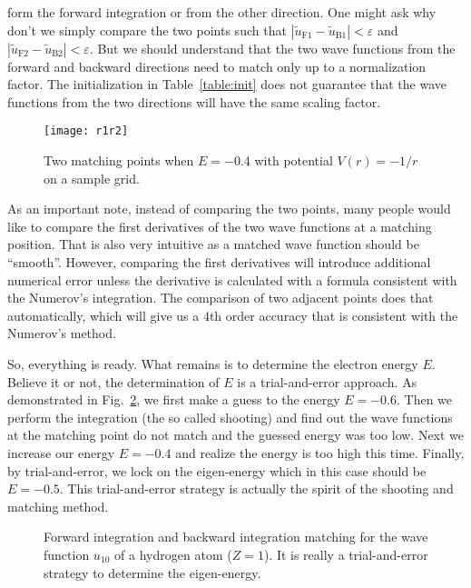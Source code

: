 form the forward integration or from the other direction. One might ask
why don't we simply compare the two points such that
$|\tilde{u}_{\text{F}1} - \tilde{u}_{\text{B}1}| < \varepsilon$
and $|\tilde{u}_{\text{F}2} - \tilde{u}_{\text{B}2}| < \varepsilon$.
But we should understand that the two wave functions from the forward and backward
directions need to match only up to a normalization factor.
The initialization in Table~\ref{table:init} does not guarantee that
the wave functions from the two directions will have the same scaling factor.
\begin{figure}[h!]
\centering
  \texttt{[image: r1r2]}
  \caption{Two matching points when $E=-0.4$ with potential $V(r)=-1/r$ on a sample grid.}
  \label{fig:r1r2}
\end{figure}

As an important note, instead of comparing the two points, many people would
like to compare the first derivatives of the two wave functions at a matching position.
That is also very intuitive as a matched wave function should be ``smooth''. However,
comparing the first derivatives will introduce additional numerical error unless the
derivative is calculated with a formula consistent with the Numerov's integration.
The comparison of two adjacent points does that automatically, which will give us
a 4th order accuracy that is consistent with the Numerov's method.

So, everything is ready. What remains is to determine the electron energy $E$.
Believe it or not, the determination of $E$ is a trial-and-error approach.
As demonstrated in Fig.~\ref{fig:match}, we first make a guess to the energy
$E=-0.6$. Then we perform the integration (the so called shooting) and find
out the wave functions at the matching point do not match and the guessed
energy was too low. Next we increase our energy $E=-0.4$ and realize the
energy is too high this time. Finally, by trial-and-error, we lock on the
eigen-energy which in this case should be $E=-0.5$. This trial-and-error strategy
is actually the spirit of the shooting and matching method.

\begin{figure}[h!]
\centering
\subfloat[][$E=-0.6$]{\texttt{[image: E06]}\label{fig:E06}}
\subfloat[][$E=-0.4$]{\texttt{[image: E04]}\label{fig:E04}}
\subfloat[][$E=-0.5$]{\texttt{[image: E05]}\label{fig:E05}}
\caption{Forward integration and backward integration matching for the wave
function $u_{10}$ of a hydrogen atom ($Z=1$). It is really a trial-and-error
strategy to determine the eigen-energy.}
\label{fig:match}
\end{figure}

